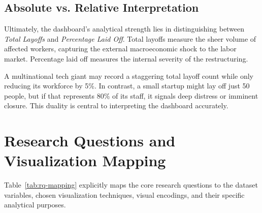 \documentclass[a4paper,12pt]{article}
\begin{document}
\subsection{Absolute vs. Relative Interpretation}
Ultimately, the dashboard's analytical strength lies in distinguishing between \textit{Total Layoffs} and \textit{Percentage Laid Off}. Total layoffs measure the sheer volume of affected workers, capturing the external macroeconomic shock to the labor market. Percentage laid off measures the internal severity of the restructuring. 

A multinational tech giant may record a staggering total layoff count while only reducing its workforce by 5\%. In contrast, a small startup might lay off just 50 people, but if that represents 80\% of its staff, it signals deep distress or imminent closure. This duality is central to interpreting the dashboard accurately.

\section{Research Questions and Visualization Mapping}
Table~\ref{tab:rq-mapping} explicitly maps the core research questions to the dataset variables, chosen visualization techniques, visual encodings, and their specific analytical purposes.
\end{document}
